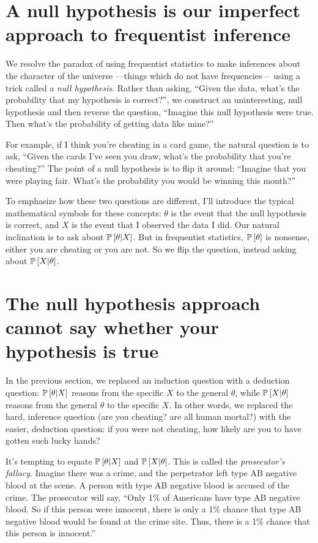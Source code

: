 \section{A null hypothesis is our imperfect approach to frequentist inference}

We resolve the paradox of using frequentist statistics to make inferences about the character of the universe ---things which do not have frequencies--- using a trick called a \emph{null hypothesis}. Rather than asking, ``Given the data, what's the probability that my hypothesis is correct?'', we construct an uninteresting, null hypothesis and then reverse the question, ``Imagine this null hypothesis were true. Then what's the probability of getting data like mine?''

For example, if I think you're cheating in a card game, the natural question is to ask, ``Given the cards I've seen you draw, what's the probability that you're cheating?'' The point of a null hypothesis is to flip it around: ``Imagine that you were playing fair. What's the probability you would be winning this month?''

To emphasize how these two questions are different, I'll introduce the typical
mathematical symbols for these concepts: $\theta$ is the event that the null
hypothesis is correct, and $X$ is the event that I observed the data I did. Our
natural inclination is to ask about $\mathbb{P}\left[{\theta | X}\right]$. But in frequentist
statistics, $\mathbb{P}\left[{\theta}\right]$ is nonsense, either you are cheating or you are not.
So we flip the question, instead asking about $\mathbb{P}\left[{X | \theta}\right]$.

\section{The null hypothesis approach cannot say whether your hypothesis is true}

In the previous section, we replaced an induction question with a deduction question: $\mathbb{P}\left[{\theta | X}\right]$ reasons from the specific $X$ to the general $\theta$, while $\mathbb{P}\left[{X | \theta}\right]$ reasons from the general $\theta$ to the specific $X$. In other words, we replaced the hard, inference question (are you cheating? are all human mortal?) with the easier, deduction question: if you were not cheating, how likely are you to have gotten such lucky hands?

It's tempting to equate $\mathbb{P}\left[{\theta | X}\right]$ and $\mathbb{P}\left[{X | \theta}\right]$. This is called the \emph{prosecutor's fallacy}. Imagine there was a crime, and the perpetrator left type AB negative blood at the scene. A person with type AB negative blood is accused of the crime. The prosecutor will say, ``Only 1\% of Americans have type AB negative blood. So if this person were innocent, there is only a 1\% chance that type AB negative blood would be found at the crime site. Thus, there is a 1\% chance that this person is innocent.''

